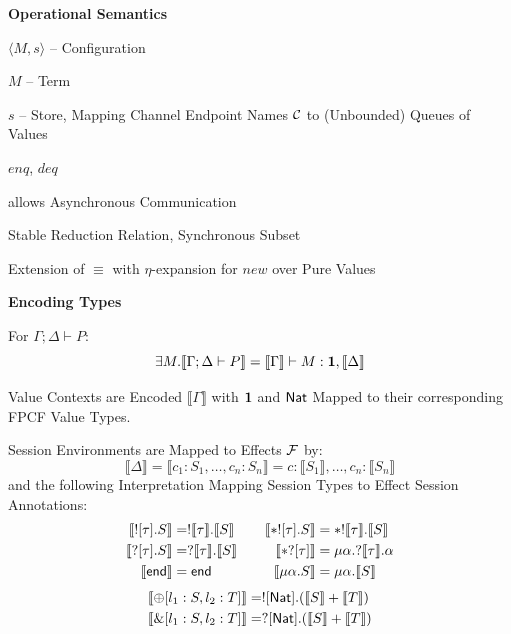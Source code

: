 \textbf{Operational Semantics}

$\langle M,s \rangle$ -- Configuration

$M$ -- Term

$s$ -- Store, Mapping Channel Endpoint Names $\mathcal{C}$ to
(Unbounded) Queues of Values

$enq$, $deq$ %


allows Asynchronous Communication

Stable Reduction Relation, Synchronous Subset

Extension of $\equiv$ with $\eta$-expansion for $new$ over Pure Values


\textbf{Encoding Types}

For $\Gamma;\Delta \vdash P$:
\[
  \exists M.\llbracket \Gamma;\Delta \vdash P \rrbracket
    = \llbracket \Gamma \rrbracket \vdash M:\mathbf{1},
      \llbracket \Delta \rrbracket
\]

Value Contexts are Encoded $\llbracket\Gamma\rrbracket$ with $\mathbf{1}$
and $\mathsf{Nat}$ Mapped to their corresponding FPCF Value Types.

Session Environments are Mapped to Effects $\mathcal{F}$ by:
\[
  \llbracket\Delta\rrbracket
    = \llbracket c_1:S_1, \ldots, c_n:S_n \rrbracket
    = c:\llbracket S_1 \rrbracket, \ldots, c_n:\llbracket S_n \rrbracket
\]
and the following Interpretation Mapping Session Types to Effect
Session Annotations:
\[
  \begin{aligned}
    \llbracket ![\tau].S \rrbracket
      &= !\llbracket\tau\rrbracket.\llbracket S \rrbracket \\
    \llbracket ?[\tau].S \rrbracket
      &= ?\llbracket\tau\rrbracket.\llbracket S \rrbracket \\
    \llbracket\mathsf{end}\rrbracket &= \mathsf{end}
  \end{aligned}
  \quad\quad
  \begin{aligned}
    \llbracket *![\tau].S \rrbracket
      &= *!\llbracket\tau\rrbracket.\llbracket S \rrbracket \\
    \llbracket *?[\tau] \rrbracket
      &= \mu\alpha.?\llbracket\tau\rrbracket.\alpha \\
    \llbracket \mu\alpha.S \rrbracket
      &= \mu\alpha.\llbracket S \rrbracket
  \end{aligned}
\]
\begin{align*}
  \llbracket \oplus[l_1:S,l_2:T] \rrbracket
    &= ![\mathsf{Nat}].(\llbracket S \rrbracket + \llbracket T \rrbracket) \\
  \llbracket \&[l_1:S,l_2:T] \rrbracket
    &= ?[\mathsf{Nat}].(\llbracket S \rrbracket + \llbracket T \rrbracket)
\end{align*}

